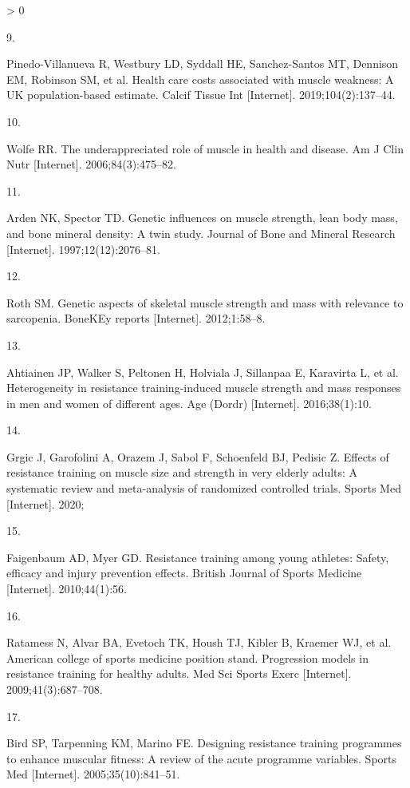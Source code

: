 \documentclass[twoside,10pt]{gihclass} %
\newlength{\cslhangindent}
\newlength{\csllabelwidth}
\newenvironment{CSLReferences}[3] %
 {%
  \setlength{\parindent}{0pt}
  \ifodd #1 \everypar{\setlength{\hangindent}{\cslhangindent}}\ignorespaces\fi
  \ifnum #2 > 0
  \setlength{\parskip}{#2\baselineskip}
  \fi
 }%
 {}
\newcommand{\CSLLeftMargin}[1]{\parbox[t]{\maxof{\widthof{#1}}{\csllabelwidth}}{#1}}
\newcommand{\CSLRightInline}[1]{\parbox[t]{\linewidth}{#1}}
\begin{document}
\begin{CSLReferences}{0}{0}
\leavevmode\hypertarget{ref-RN2184}{}%
\CSLLeftMargin{9. }
\CSLRightInline{Pinedo-Villanueva R, Westbury LD, Syddall HE, Sanchez-Santos MT, Dennison EM, Robinson SM, et al. Health care costs associated with muscle weakness: A UK population-based estimate. Calcif Tissue Int {[}Internet{]}. 2019;104(2):137--44. }

\leavevmode\hypertarget{ref-RN763}{}%
\CSLLeftMargin{10. }
\CSLRightInline{Wolfe RR. The underappreciated role of muscle in health and disease. Am J Clin Nutr {[}Internet{]}. 2006;84(3):475--82. }

\leavevmode\hypertarget{ref-RN2526}{}%
\CSLLeftMargin{11. }
\CSLRightInline{Arden NK, Spector TD. Genetic influences on muscle strength, lean body mass, and bone mineral density: A twin study. Journal of Bone and Mineral Research {[}Internet{]}. 1997;12(12):2076--81. }

\leavevmode\hypertarget{ref-RN2527}{}%
\CSLLeftMargin{12. }
\CSLRightInline{Roth SM. Genetic aspects of skeletal muscle strength and mass with relevance to sarcopenia. BoneKEy reports {[}Internet{]}. 2012;1:58--8. }

\leavevmode\hypertarget{ref-RN1741}{}%
\CSLLeftMargin{13. }
\CSLRightInline{Ahtiainen JP, Walker S, Peltonen H, Holviala J, Sillanpaa E, Karavirta L, et al. Heterogeneity in resistance training-induced muscle strength and mass responses in men and women of different ages. Age (Dordr) {[}Internet{]}. 2016;38(1):10. }

\leavevmode\hypertarget{ref-RN2534}{}%
\CSLLeftMargin{14. }
\CSLRightInline{Grgic J, Garofolini A, Orazem J, Sabol F, Schoenfeld BJ, Pedisic Z. Effects of resistance training on muscle size and strength in very elderly adults: A systematic review and meta-analysis of randomized controlled trials. Sports Med {[}Internet{]}. 2020; }

\leavevmode\hypertarget{ref-RN2536}{}%
\CSLLeftMargin{15. }
\CSLRightInline{Faigenbaum AD, Myer GD. Resistance training among young athletes: Safety, efficacy and injury prevention effects. British Journal of Sports Medicine {[}Internet{]}. 2010;44(1):56. }

\leavevmode\hypertarget{ref-RN1}{}%
\CSLLeftMargin{16. }
\CSLRightInline{Ratamess N, Alvar BA, Evetoch TK, Housh TJ, Kibler B, Kraemer WJ, et al. American college of sports medicine position stand. Progression models in resistance training for healthy adults. Med Sci Sports Exerc {[}Internet{]}. 2009;41(3):687--708. }

\leavevmode\hypertarget{ref-RN798}{}%
\CSLLeftMargin{17. }
\CSLRightInline{Bird SP, Tarpenning KM, Marino FE. Designing resistance training programmes to enhance muscular fitness: A review of the acute programme variables. Sports Med {[}Internet{]}. 2005;35(10):841--51. }


\end{CSLReferences}
\end{document}
